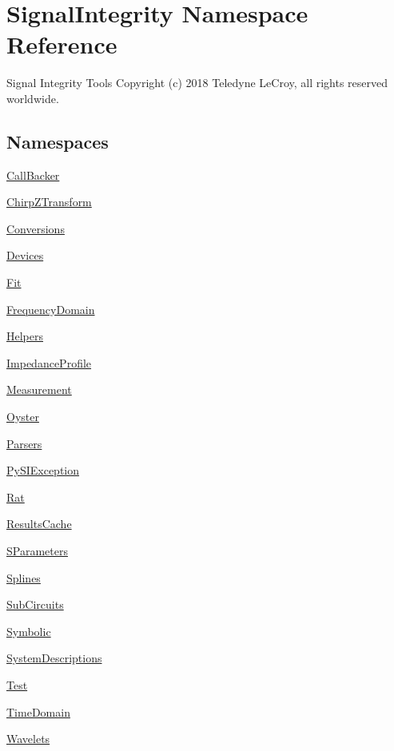 \hypertarget{namespaceSignalIntegrity}{}\section{Signal\+Integrity Namespace Reference}
\label{namespaceSignalIntegrity}


Signal Integrity Tools Copyright (c) 2018 Teledyne Le\+Croy, all rights reserved worldwide.  


\subsection*{Namespaces}
\begin{DoxyCompactItemize}
\item 
 \hyperlink{namespaceSignalIntegrity_1_1CallBacker}{Call\+Backer}
\item 
 \hyperlink{namespaceSignalIntegrity_1_1ChirpZTransform}{Chirp\+Z\+Transform}
\item 
 \hyperlink{namespaceSignalIntegrity_1_1Conversions}{Conversions}
\item 
 \hyperlink{namespaceSignalIntegrity_1_1Devices}{Devices}
\item 
 \hyperlink{namespaceSignalIntegrity_1_1Fit}{Fit}
\item 
 \hyperlink{namespaceSignalIntegrity_1_1FrequencyDomain}{Frequency\+Domain}
\item 
 \hyperlink{namespaceSignalIntegrity_1_1Helpers}{Helpers}
\item 
 \hyperlink{namespaceSignalIntegrity_1_1ImpedanceProfile}{Impedance\+Profile}
\item 
 \hyperlink{namespaceSignalIntegrity_1_1Measurement}{Measurement}
\item 
 \hyperlink{namespaceSignalIntegrity_1_1Oyster}{Oyster}
\item 
 \hyperlink{namespaceSignalIntegrity_1_1Parsers}{Parsers}
\item 
 \hyperlink{namespaceSignalIntegrity_1_1PySIException}{Py\+S\+I\+Exception}
\item 
 \hyperlink{namespaceSignalIntegrity_1_1Rat}{Rat}
\item 
 \hyperlink{namespaceSignalIntegrity_1_1ResultsCache}{Results\+Cache}
\item 
 \hyperlink{namespaceSignalIntegrity_1_1SParameters}{S\+Parameters}
\item 
 \hyperlink{namespaceSignalIntegrity_1_1Splines}{Splines}
\item 
 \hyperlink{namespaceSignalIntegrity_1_1SubCircuits}{Sub\+Circuits}
\item 
 \hyperlink{namespaceSignalIntegrity_1_1Symbolic}{Symbolic}
\item 
 \hyperlink{namespaceSignalIntegrity_1_1SystemDescriptions}{System\+Descriptions}
\item 
 \hyperlink{namespaceSignalIntegrity_1_1Test}{Test}
\item 
 \hyperlink{namespaceSignalIntegrity_1_1TimeDomain}{Time\+Domain}
\item 
 \hyperlink{namespaceSignalIntegrity_1_1Wavelets}{Wavelets}
\end{DoxyCompactItemize}


